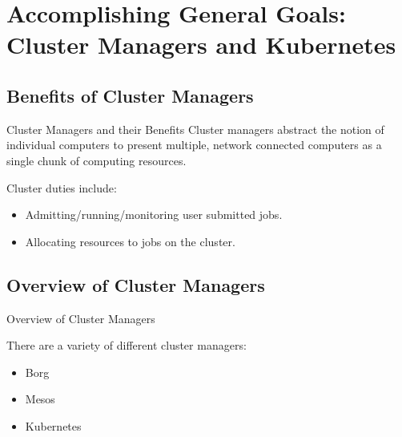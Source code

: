 \documentclass{beamer}
\begin{document}
\section{Accomplishing General Goals: Cluster Managers and Kubernetes}

\subsection{Benefits of Cluster Managers}

\begin{frame}{Cluster Managers and their Benefits}
  Cluster managers abstract the notion of individual computers to present
  multiple, network connected computers as a single chunk of computing resources.

  Cluster duties include:

  \begin{itemize}
    \item Admitting/running/monitoring user submitted jobs.
    \item Allocating resources to jobs on the cluster.
  \end{itemize}

\end{frame}

\subsection{Overview of Cluster Managers}

\begin{frame}{Overview of Cluster Managers}

There are a variety of different cluster managers:

\begin{itemize}
  \item Borg
  \item Mesos
  \item Kubernetes
\end{itemize}

\end{frame}
\end{document}
